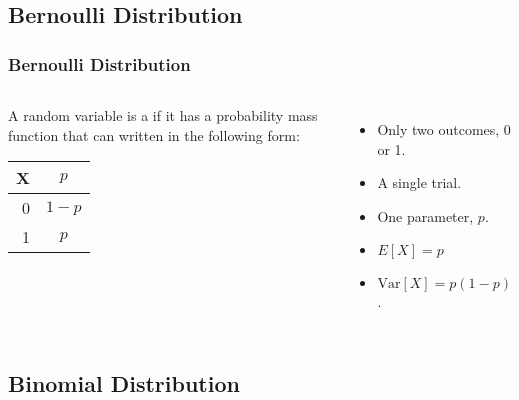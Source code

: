 \subsection{Bernoulli Distribution}

\begin{frame}
  \frametitle{Bernoulli Distribution}

  \begin{columns}
    \begin{definition}
      A random variable is a  if it
      has
      a probability mass function that can written in the following form:\\
      \begin{tabular}{r|c}
        X & $p$ \\ \hline
        0 & $1-p$ \\
        1 & $p$
      \end{tabular}
    \end{definition}
    \begin{itemize}
    \item Only two outcomes, 0 or 1.
    \item A single trial.
    \item One parameter, $p$.
    \item $E[X]=p$
    \item $\mathrm{Var}[X]=p(1-p)$.
    \end{itemize}
  \end{columns}
\end{frame}




\subsection{Binomial Distribution}

